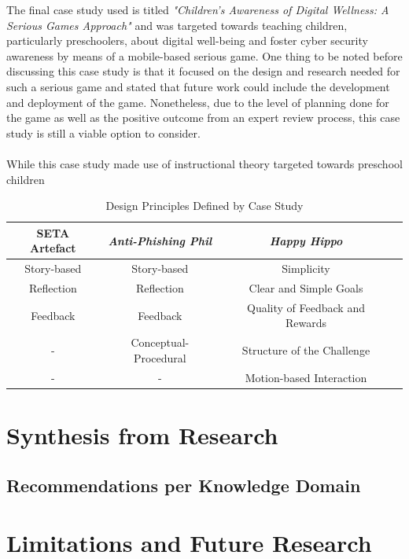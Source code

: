 \documentclass[conference]{IEEEtran}
\begin{document}
The final case study used is titled \textit{"Children’s Awareness of Digital Wellness: A Serious Games Approach"} and was targeted towards teaching children, particularly preschoolers, about digital well-being and foster cyber security awareness by means of a mobile-based serious game\cite{allers2021children}. One thing to be noted before discussing this case study is that it focused on the design and research needed for such a serious game and stated that future work could include the development and deployment of the game\cite{allers2021children}. Nonetheless, due to the level of planning done for the game as well as the positive outcome from an expert review process, this case study is still a viable option to consider. 
\\\\
While this case study made use of instructional theory targeted towards preschool children\cite{allers2021children, callaghan2018} 






\begin{table}[htbp]
\caption{Design Principles Defined by Case Study \cite{Dincelli2020,Sheng2007,allers2021children}}
\begin{adjustwidth}{-0.0cm}{}
\begin{tabular}{|c|c|c|c|}
\hline

\textbf{SETA Artefact} & \textbf{\textit{Anti-Phishing Phil}}& \textbf{\textit{Happy Hippo}} \\
\hline
Story-based	& Story-based 			& Simplicity  \\
Reflection	& Reflection			& Clear and Simple Goals  \\
Feedback	& Feedback 				& Quality of Feedback and Rewards  \\
	-		& Conceptual-Procedural	& Structure of the Challenge  \\
	-		& 		-				& Motion-based Interaction  \\
\hline

\end{tabular}
\label{tab1}
\end{adjustwidth}
\end{table}





\section{Synthesis from Research}
\subsection{Recommendations per Knowledge Domain}


\section{Limitations and Future Research}

\printbibliography
\end{document}
